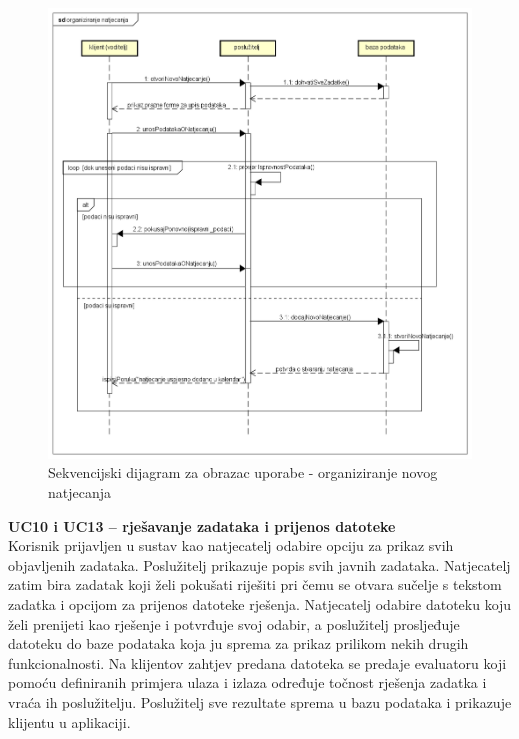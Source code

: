 				\begin{figure}[H]
					\includegraphics[scale=0.6]{dijagrami/sd17.png} 
					\centering
					\caption{Sekvencijski dijagram za obrazac uporabe - organiziranje novog natjecanja}
					\label{fig:sekvencijski2}
				\end{figure}
				\pagebreak
				
				\noindent \textbf{UC10 i UC13 – rješavanje zadataka i prijenos datoteke}\\
				
				\noindent Korisnik prijavljen u sustav kao natjecatelj odabire opciju za prikaz svih objavljenih zadataka. Poslužitelj prikazuje popis svih javnih zadataka. Natjecatelj zatim bira zadatak koji želi pokušati riješiti pri čemu se otvara sučelje s tekstom zadatka i opcijom za prijenos datoteke rješenja. Natjecatelj odabire datoteku koju želi prenijeti kao rješenje i potvrđuje svoj odabir, a poslužitelj prosljeđuje datoteku do baze podataka koja ju sprema za prikaz prilikom nekih drugih funkcionalnosti. Na klijentov zahtjev predana datoteka se predaje evaluatoru koji pomoću definiranih primjera ulaza i izlaza određuje točnost rješenja zadatka i vraća ih poslužitelju. Poslužitelj sve rezultate sprema u bazu podataka i prikazuje klijentu u aplikaciji.
				
